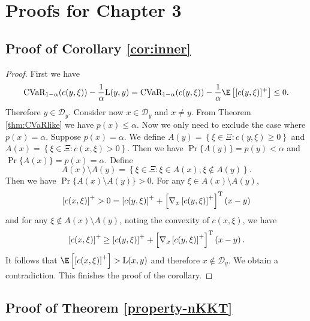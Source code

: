 \chapter{Proofs for Chapter 3}\label{c3:appendix}



\section{Proof of Corollary \ref{cor:inner}}

\begin{proof}
First we have
\[\mbox{CVaR}_{1-\alpha}(c(y,\xi))-\frac{1}{\alpha}\mbox{L}(y,y)=\mbox{CVaR}_{1-\alpha}
(c(y,\xi))-\frac{1}{\alpha}\E\left[[c(y,\xi)]^+\right]\le0.\]
Therefore $y\in\mathcal {D}_y$. Consider now $x\in \mathcal {D}_y$
and $x\not=y$. From Theorem \ref{thm:CVaRlike} we have
$p(x)\le \alpha$.  %
Now we only need to exclude the case where $p(x)=\alpha$. Suppose
$p(x)=\alpha$. We define $A(y)=\left\{\xi\in\Xi:
c(y,\xi)\geq0\right\}$ and $A(x)=\left\{\xi\in\Xi:
c(x,\xi)>0\right\}$. Then we have $\Pr\{A(y)\}=p(y)<\alpha$ and
$\Pr\{A(x)\}=p(x)=\alpha$. Define
\[A(x)\setminus A(y)=\left\{\xi\in \Xi: \xi\in A(x),\xi\not\in
A(y)\right\}.\] Then we have $\Pr\{A(x)\setminus A(y)\}>0$. For any
$\xi\in A(x)\setminus A(y)$,
\[\left[c(x,\xi)\right]^+>0=\left[c(y,\xi)\right]^+
+\left[\nabla_x\left[c(y,\xi)\right]^+\right]^{\rm
T}\left(x-y\right)\] and for any $\xi\not\in A(x)\setminus A(y)$,
noting the convexity of $c(x,\xi)$, we have
\[\left[c(x,\xi)\right]^+\geq\left[c(y,\xi)\right]^+
+\left[\nabla_x\left[c(y,\xi)\right]^+\right]^{\rm
T}\left(x-y\right).\] It follows that
$\E\left[\left[c(x,\xi)\right]^+\right]>\mbox{L}(x,y)$ and therefore
$x\not\in \mathcal {D}_y$. We obtain a contradiction. This finishes
the proof of the corollary.
\end{proof}



\section{Proof of Theorem \ref{property-nKKT}}

